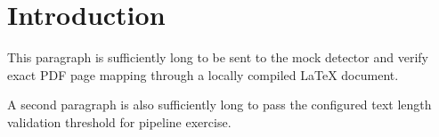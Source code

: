 \documentclass{article}
\begin{document}
\section{Introduction}
This paragraph is sufficiently long to be sent to the mock detector and verify exact PDF page mapping through a locally compiled LaTeX document.

A second paragraph is also sufficiently long to pass the configured text length validation threshold for pipeline exercise.
\end{document}
